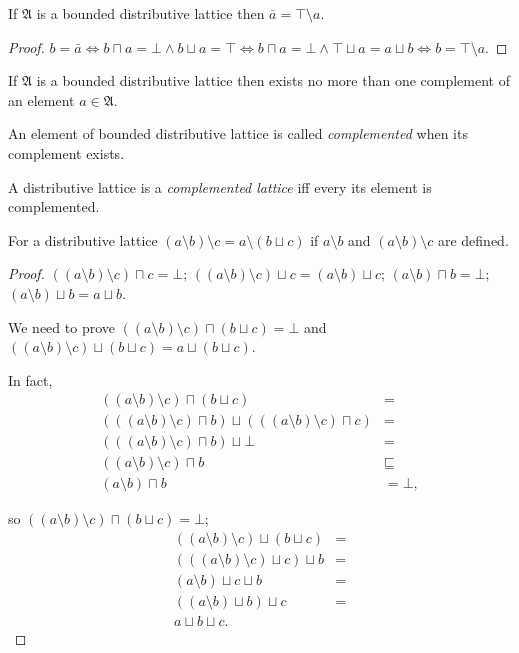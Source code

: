 \begin{prop}
If $\mathfrak{A}$ is a bounded distributive lattice then $\bar{a}=\top\setminus a$.\end{prop}
\begin{proof}
$b=\bar{a}\Leftrightarrow b\sqcap a=\bot\land b\sqcup a=\top\Leftrightarrow b\sqcap a=\bot\land\top\sqcup a=a\sqcup b\Leftrightarrow b=\top\setminus a$.\end{proof}
\begin{cor}
If $\mathfrak{A}$ is a bounded distributive lattice then exists no
more than one complement of an element $a\in\mathfrak{A}$.\end{cor}
\begin{defn}
An element of bounded distributive lattice
is called \emph{complemented} when its complement exists.
\end{defn}

\begin{defn}
A distributive lattice is a \emph{complemented
lattice} iff every its element is complemented.\end{defn}
\begin{prop}
For a distributive lattice $(a\setminus b)\setminus c=a\setminus(b\sqcup c)$
if $a\setminus b$ and $(a\setminus b)\setminus c$ are defined.\end{prop}
\begin{proof}
$((a\setminus b)\setminus c)\sqcap c=\bot$; $((a\setminus b)\setminus c)\sqcup c=(a\setminus b)\sqcup c$;
$(a\setminus b)\sqcap b=\bot$; $(a\setminus b)\sqcup b=a\sqcup b$.

We need to prove $((a\setminus b)\setminus c)\sqcap(b\sqcup c)=\bot$
and $((a\setminus b)\setminus c)\sqcup(b\sqcup c)=a\sqcup(b\sqcup c)$.

In fact,
\begin{align*}
((a\setminus b)\setminus c)\sqcap(b\sqcup c) & =\\
(((a\setminus b)\setminus c)\sqcap b)\sqcup(((a\setminus b)\setminus c)\sqcap c) & =\\
(((a\setminus b)\setminus c)\sqcap b)\sqcup\bot & =\\
((a\setminus b)\setminus c)\sqcap b & \sqsubseteq\\
(a\setminus b)\sqcap b & =\bot,
\end{align*}


so $((a\setminus b)\setminus c)\sqcap(b\sqcup c)=\bot$;
\begin{align*}
((a\setminus b)\setminus c)\sqcup(b\sqcup c) & =\\
(((a\setminus b)\setminus c)\sqcup c)\sqcup b & =\\
(a\setminus b)\sqcup c\sqcup b & =\\
((a\setminus b)\sqcup b)\sqcup c & =\\
a\sqcup b\sqcup c.
\end{align*}

\end{proof}

